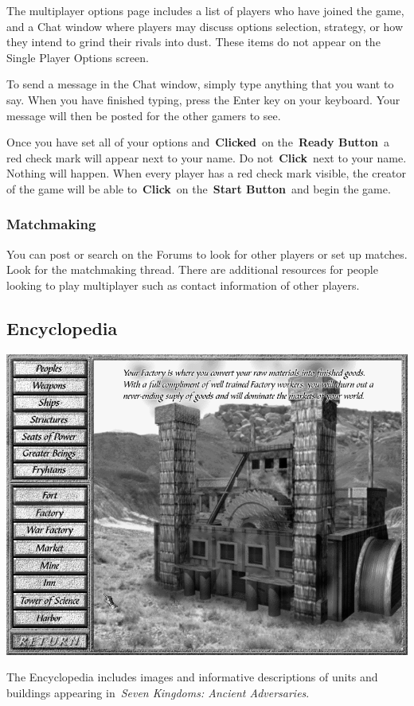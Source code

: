 The multiplayer options page includes a list of players who have joined the game, and a Chat window where players may discuss options selection, strategy, or how they intend to grind their rivals into dust. These items do not appear on the Single Player Options screen.

To send a message in the Chat window, simply type anything that you want to say. When you have finished typing, press the Enter key on your keyboard. Your message will then be posted for the other gamers to see.

Once you have set all of your options and \textbf{Clicked} on the \textbf{Ready Button} a red check mark will appear next to your name. Do not \textbf{Click} next to your name. Nothing will happen. When every player has a red check mark visible, the creator of the game will be able to \textbf{Click} on the \textbf{Start Button} and begin the game.

\subsubsection{Matchmaking}

You can post or search on the Forums to look for other players or set up matches. Look for the matchmaking thread. There are additional resources for people looking to play multiplayer such as contact information of other players.

\subsection{Encyclopedia}

\begin{center}
	\includegraphics[width=0.7\linewidth]{Iencyclopedia}
\end{center}

The Encyclopedia includes images and informative descriptions of units and buildings appearing in \textit{Seven Kingdoms: Ancient Adversaries}.

